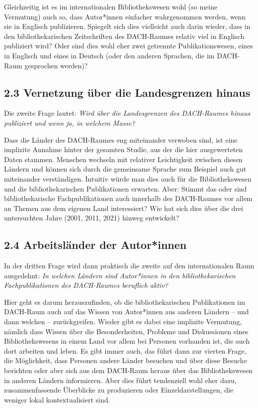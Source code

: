 \documentclass[a4paper,
fontsize=11pt,
oneside,
numbers=noperiodatend,
parskip=half-,
bibliography=totoc,
final
]{scrartcl}
\begin{document}
Gleichzeitig ist es im internationalen Bibliothekswesen wohl (so meine
Vermutung) auch so, dass Autor*innen einfacher wahrgenommen werden, wenn
sie in Englisch publizieren. Spiegelt sich dies vielleicht auch darin
wieder, dass in den bibliothekarischen Zeitschriften des DACH-Raumes
relativ viel in Englisch publiziert wird? Oder sind dies wohl eher zwei
getrennte Publikationswesen, eines in Englisch und eines in Deutsch
(oder den anderen Sprachen, die im DACH-Raum gesprochen werden)?

\hypertarget{vernetzung-uxfcber-die-landesgrenzen-hinaus}{%
\subsection{2.3 Vernetzung über die Landesgrenzen
hinaus}\label{vernetzung-uxfcber-die-landesgrenzen-hinaus}}

Die zweite Frage lautet: \emph{Wird über die Landesgrenzen des
DACH-Raumes hinaus publiziert und wenn ja, in welchem Masse?}

Dass die Länder des DACH-Raumes eng miteinander verwoben sind, ist eine
implizite Annahme hinter der gesamten Studie, aus der die hier
ausgewerteten Daten stammen. Menschen wechseln mit relativer
Leichtigkeit zwischen diesen Ländern und können sich durch die
gemeinsame Sprache zum Beispiel auch gut miteinander verständigen.
Intuitiv würde man dies auch für die Bibliothekswesen und die
bibliothekarischen Publikationen erwarten. Aber: Stimmt das oder sind
bibliothekarische Fachpublikationen auch innerhalb des DACH-Raumes vor
allem an Themen aus dem eigenen Land interessiert? Wie hat sich dies
über die drei untersuchten Jahre (2001, 2011, 2021) hinweg entwickelt?

\hypertarget{arbeitsluxe4nder-der-autorinnen}{%
\subsection{2.4 Arbeitsländer der
Autor*innen}\label{arbeitsluxe4nder-der-autorinnen}}

In der dritten Frage wird dann praktisch die zweite auf den
internationalen Raum ausgedehnt: \emph{In welchen Ländern sind
Autor*innen in den bibliothekarischen Fachpublikationen des DACH-Raumes
beruflich aktiv?}

Hier geht es darum herauszufinden, ob die bibliothekarischen
Publikationen im DACH-Raum auch auf das Wissen von Autor*innen aus
anderen Ländern -- und dann welchen -- zurückgreifen. Wieder gibt es
dabei eine implizite Vermutung, nämlich dass Wissen über die
Besonderheiten, Probleme und Diskussionen eines Bibliothekswesens in
einem Land vor allem bei Personen vorhanden ist, die auch dort arbeiten
und leben. Es gibt immer auch, das führt dann zur vierten Frage, die
Möglichkeit, dass Personen andere Länder besuchen und über diese Besuche
berichten oder aber sich aus dem DACH-Raum heraus über das
Bibliothekswesen in anderen Ländern informieren. Aber dies führt
tendenziell wohl eher dazu, zusammenfassende Überblicke zu produzieren
oder Einzeldarstellungen, die weniger lokal kontextualisiert sind.
\end{document}
